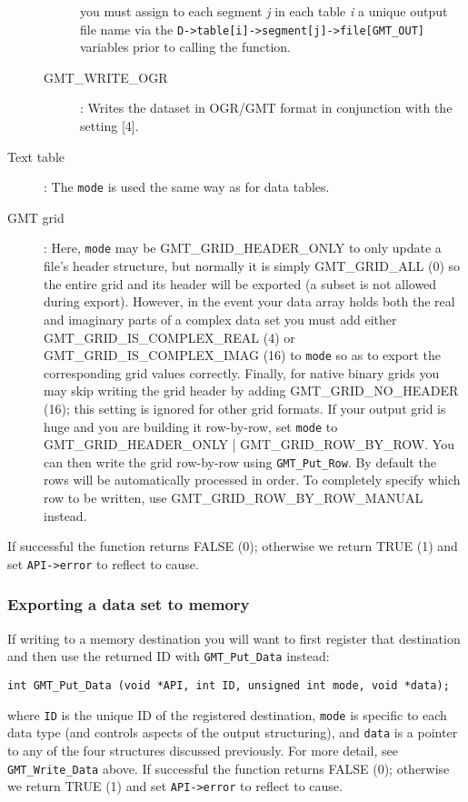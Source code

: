 \documentclass[11pt]{report}
\begin{document}
\begin{description}
\begin{description}
you must assign to each segment \emph{j} in each table \emph{i} a unique output file name
via the \texttt{D->table[i]->segment[j]->file[GMT\_OUT]} variables prior to calling the function.
\item [GMT\_WRITE\_OGR]: Writes the dataset in OGR/GMT format in conjunction with the  setting [4].
\end{description}
\item [Text table]: The \texttt{mode} is used the same way as for data tables.
\item [GMT grid]: Here, \texttt{mode} may be GMT\_GRID\_HEADER\_ONLY to only update a file's header
structure, but normally it is simply GMT\_GRID\_ALL (0) so the entire
grid and its header will be exported (a subset is not allowed during export).
However, in the event your data array holds both the real and imaginary parts of a
complex data set you must add either GMT\_GRID\_IS\_COMPLEX\_REAL (4) or GMT\_GRID\_IS\_COMPLEX\_IMAG (16) to \texttt{mode}
so as to export the corresponding grid values correctly.  Finally, for native binary grids you may skip writing
the grid header by adding GMT\_GRID\_NO\_HEADER (16); this setting is ignored for other grid formats.
If your output grid is huge and you are building it row-by-row, set \texttt{mode} to
GMT\_GRID\_HEADER\_ONLY | GMT\_GRID\_ROW\_BY\_ROW.  You can then write the grid row-by-row
using \texttt{GMT\_Put\_Row}.  By default the rows will be automatically
processed in order.  To completely specify which row to be written, use GMT\_GRID\_ROW\_BY\_ROW\_MANUAL
instead.
\end{description}
If successful the function returns FALSE (0); otherwise we return TRUE (1) and set \texttt{API->error} to reflect to cause.

\subsubsection{Exporting a data set to memory}

If writing to a memory destination you will want to first register that destination and then use the returned ID with
\texttt{GMT\_Put\_Data} instead:

\begin{verbatim}
int GMT_Put_Data (void *API, int ID, unsigned int mode, void *data);
\end{verbatim}
where \texttt{ID} is the unique ID of the registered destination, \texttt{mode}
is specific to each data type (and controls aspects of the output structuring),
and \texttt{data} is a pointer to any of the four structures
discussed previously.  For more detail, see \texttt{GMT\_Write\_Data} above.
If successful the function returns FALSE (0); otherwise we return TRUE (1) and set \texttt{API->error} to reflect to cause.
\end{document}
